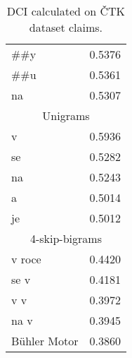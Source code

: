 \begin{table}[ht]
{\begin{tabular}{lr}
                \#\#y & 0.5376 \\
                \#\#u & 0.5361 \\
                na & 0.5307 \\
            \midrule
            \multicolumn{2}{c}{Unigrams} \\
                v & 0.5936 \\
                se & 0.5282 \\
                na & 0.5243 \\
                a & 0.5014 \\
                je & 0.5012 \\
            \midrule
            \multicolumn{2}{c}{4-skip-bigrams} \\
                v roce & 0.4420 \\
                se v & 0.4181 \\
                v v & 0.3972 \\
                na v & 0.3945 \\
                Bühler Motor & 0.3860 \\
            \bottomrule
        \end{tabular}
        \caption{DCI calculated on ČTK dataset claims.}
        \label{table:claim-quality-ctk-dci}
        }
    \end{table}
    
